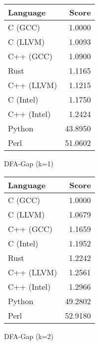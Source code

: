\begin{subtable}{0.33\textwidth}
    \centering
    \begin{tabular}{|l|r|}
        \hline
        Language & Score \\
        \hline
        C (GCC) & 1.0000 \\
        C (LLVM) & 1.0093 \\
        C++ (GCC) & 1.0900 \\
        Rust & 1.1165 \\
        C++ (LLVM) & 1.1215 \\
        C (Intel) & 1.1750 \\
        C++ (Intel) & 1.2424 \\
        Python & 43.8950 \\
        Perl & 51.0602 \\
        \hline
    \end{tabular}
    \caption{DFA-Gap (k=1)}
    \label{table:runtime:dfa_gap(1)}
\end{subtable}%
\begin{subtable}{0.33\textwidth}
    \centering
    \begin{tabular}{|l|r|}
        \hline
        Language & Score \\
        \hline
        C (GCC) & 1.0000 \\
        C (LLVM) & 1.0679 \\
        C++ (GCC) & 1.1659 \\
        C (Intel) & 1.1952 \\
        Rust & 1.2242 \\
        C++ (LLVM) & 1.2561 \\
        C++ (Intel) & 1.2966 \\
        Python & 49.2802 \\
        Perl & 52.9180 \\
        \hline
    \end{tabular}
    \caption{DFA-Gap (k=2)}
    \label{table:runtime:dfa_gap(2)}
\end{subtable}
